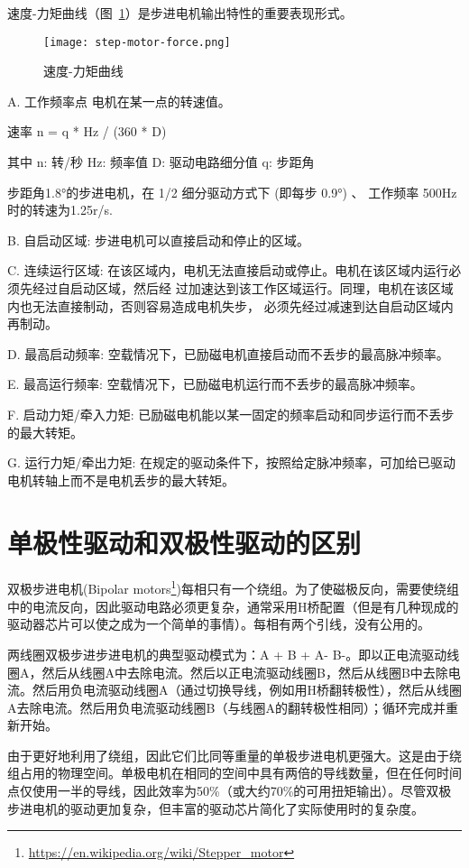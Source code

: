 速度-力矩曲线（图~\ref{fig:step-motor-force}）是步进电机输出特性的重要表现形式。

\begin{figure}[htbp]
    \centering
    \texttt{[image: step-motor-force.png]}
    \caption{速度-力矩曲线}
    \label{fig:step-motor-force}
\end{figure}

A. 工作频率点 电机在某一点的转速值。

速率 n = q * Hz / (360 * D)

其中 n: 转/秒 Hz: 频率值 D: 驱动电路细分值 q: 步距角

步距角1.8°的步进电机，在 1/2 细分驱动方式下 (即每步 0.9°) 、 工作频率 500Hz 时的转速为1.25r/s.

B. 自启动区域: 步进电机可以直接启动和停止的区域。

C. 连续运行区域: 在该区域内，电机无法直接启动或停止。电机在该区域内运行必须先经过自启动区域，然后经 过加速达到该工作区域运行。同理，电机在该区域内也无法直接制动，否则容易造成电机失步， 必须先经过减速到达自启动区域内再制动。

D. 最高启动频率: 空载情况下，已励磁电机直接启动而不丢步的最高脉冲频率。

E. 最高运行频率: 空载情况下，已励磁电机运行而不丢步的最高脉冲频率。

F. 启动力矩/牵入力矩: 已励磁电机能以某一固定的频率启动和同步运行而不丢步的最大转矩。

G. 运行力矩/牵出力矩: 在规定的驱动条件下，按照给定脉冲频率，可加给已驱动电机转轴上而不是电机丢步的最大转矩。

\section{单极性驱动和双极性驱动的区别}

双极步进电机(Bipolar motors\footnote{\url{https://en.wikipedia.org/wiki/Stepper_motor}})每相只有一个绕组。为了使磁极反向，需要使绕组中的电流反向，因此驱动电路必须更复杂，通常采用H桥配置（但是有几种现成的驱动器芯片可以使之成为一个简单的事情）。每相有两个引线，没有公用的。

两线圈双极步进步进电机的典型驱动模式为：A + B + A- B-。即以正电流驱动线圈A，然后从线圈A中去除电流。然后以正电流驱动线圈B，然后从线圈B中去除电流。然后用负电流驱动线圈A（通过切换导线，例如用H桥翻转极性），然后从线圈A去除电流。然后用负电流驱动线圈B（与线圈A的翻转极性相同）；循环完成并重新开始。

由于更好地利用了绕组，因此它们比同等重量的单极步进电机更强大。这是由于绕组占用的物理空间。单极电机在相同的空间中具有两倍的导线数量，但在任何时间点仅使用一半的导线，因此效率为50\%（或大约70\%的可用扭矩输出）。尽管双极步进电机的驱动更加复杂，但丰富的驱动芯片简化了实际使用时的复杂度。

